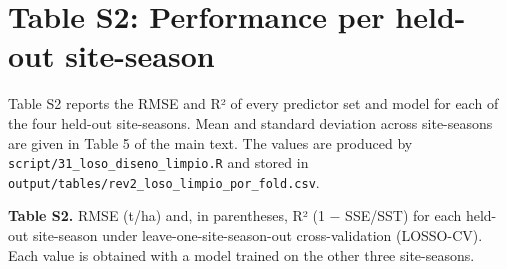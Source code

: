 \documentclass[
  english,
  review,
  number,
  sort,compress,
  authoryear,
  3p]{elsarticle}
\begin{document}
\section{Table S2: Performance per held-out
site-season}\label{table-s2-performance-per-held-out-site-season}

Table S2 reports the RMSE and R² of every predictor set and model for
each of the four held-out site-seasons. Mean and standard deviation
across site-seasons are given in Table 5 of the main text. The values
are produced by \texttt{script/31\_loso\_diseno\_limpio.R} and stored in
\texttt{output/tables/rev2\_loso\_limpio\_por\_fold.csv}.

\textbf{Table S2.} RMSE (t/ha) and, in parentheses, R² (1 − SSE/SST) for
each held-out site-season under leave-one-site-season-out
cross-validation (LOSSO-CV). Each value is obtained with a model trained
on the other three site-seasons.
\end{document}
